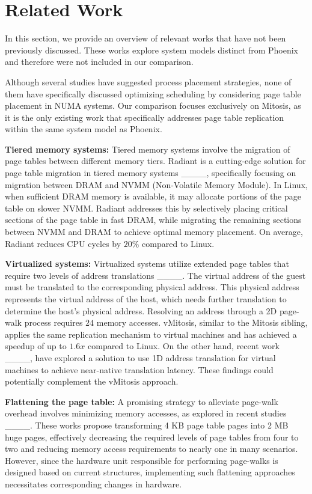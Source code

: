 \section{Related Work}
\label{section:related-works}
In this section, we provide an overview of relevant works that have not been previously discussed. These works explore system models distinct from Phoenix and therefore were not included in our comparison.

Although several studies have suggested process placement strategies, none of them have specifically discussed optimizing scheduling by considering page table placement in NUMA systems. Our comparison focuses exclusively on Mitosis, as it is the only existing work that specifically addresses page table replication within the same system model as Phoenix.

\textbf{Tiered memory systems:} Tiered memory systems involve the migration of page tables between different memory tiers. Radiant is a cutting-edge solution for page table migration in tiered memory systems ____, specifically focusing on migration between DRAM and NVMM (Non-Volatile Memory Module). In Linux, when sufficient DRAM memory is available, it may allocate portions of the page table on slower NVMM. Radiant addresses this by selectively placing critical sections of the page table in fast DRAM, while migrating the remaining sections between NVMM and DRAM to achieve optimal memory placement. On average, Radiant reduces CPU cycles by $20\%$ compared to Linux.

\textbf{Virtualized systems:}
Virtualized systems utilize extended page tables that require two levels of address translations ____. The virtual address of the guest must be translated to the corresponding physical address. This physical address represents the virtual address of the host, which needs further translation to determine the host's physical address. Resolving an address through a 2D page-walk process requires $24$ memory accesses. vMitosis, similar to the Mitosis sibling, applies the same replication mechanism to virtual machines and has achieved a speedup of up to $1.6x$ compared to Linux. On the other hand, recent work ____, have explored a solution to use 1D address translation for virtual machines to achieve near-native translation latency. These findings could potentially complement the vMitosis approach.

\textbf{Flattening the page table:}
A promising strategy to alleviate page-walk overhead involves minimizing memory accesses, as explored in recent studies ____. These works propose transforming 4 KB page table pages into 2 MB huge pages, effectively decreasing the required levels of page tables from four to two and reducing memory access requirements to nearly one in many scenarios. However, since the hardware unit responsible for performing page-walks is designed based on current structures, implementing such flattening approaches necessitates corresponding changes in hardware.

